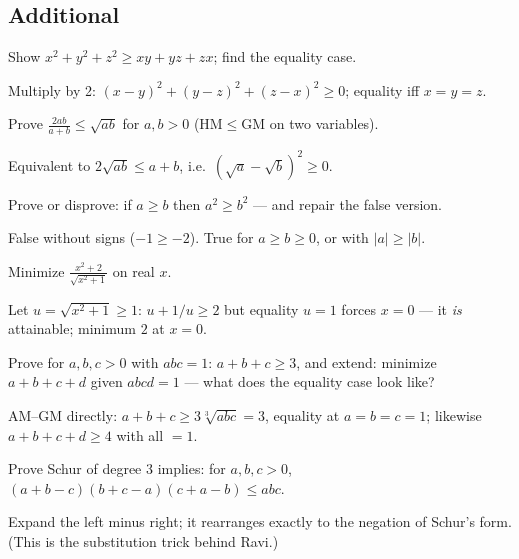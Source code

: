 \subsection*{Additional}
\begin{exercise}[easy]\label{exr:a1}
Show $x^2+y^2+z^2\ge xy+yz+zx$; find the equality case.
\end{exercise}
\begin{solution}
Multiply by 2: $(x-y)^2+(y-z)^2+(z-x)^2\ge0$; equality iff $x=y=z$.
\end{solution}
\begin{exercise}[easy]\label{exr:a2}
Prove $\frac{2ab}{a+b}\le\sqrt{ab}$ for $a,b>0$ (HM$\le$GM on two
variables).
\end{exercise}
\begin{solution}
Equivalent to $2\sqrt{ab}\le a+b$, i.e.\ $(\sqrt a-\sqrt b)^2\ge0$.
\end{solution}
\begin{exercise}[easy]\label{exr:a3}
Prove or disprove: if $a\ge b$ then $a^2\ge b^2$ --- and repair the
false version.
\end{exercise}
\begin{solution}
False without signs ($-1\ge-2$). True for $a\ge b\ge0$, or with $|a|\ge|b|$.
\end{solution}
\begin{exercise}[easy]\label{exr:a4}
Minimize $\frac{x^2+2}{\sqrt{x^2+1}}$ on real $x$.
\end{exercise}
\begin{solution}
Let $u=\sqrt{x^2+1}\ge1$: $u+1/u\ge2$ but equality $u=1$ forces $x=0$ ---
it \emph{is} attainable; minimum $2$ at $x=0$.
\end{solution}
\begin{exercise}[medium]\label{exr:a5}
Prove for $a,b,c>0$ with $abc=1$: $a+b+c\ge3$, and extend: minimize
$a+b+c+d$ given $abcd=1$ ---
what does the equality case look like?
\end{exercise}
\begin{solution}
AM--GM directly: $a+b+c\ge3\sqrt[3]{abc}=3$, equality at $a=b=c=1$;
likewise $a+b+c+d\ge4$ with all $=1$.
\end{solution}
\begin{exercise}[medium]\label{exr:a6}
Prove Schur of degree 3 implies: for $a,b,c>0$,
$(a+b-c)(b+c-a)(c+a-b)\le abc$.
\end{exercise}
\begin{solution}
Expand the left minus right; it rearranges exactly to the negation of
Schur's form. (This is the substitution trick behind Ravi.)
\end{solution}
